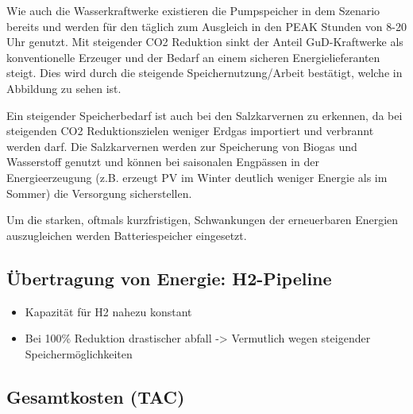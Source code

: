 Wie auch die Wasserkraftwerke existieren die Pumpspeicher in dem Szenario bereits und werden für den täglich zum Ausgleich in den PEAK Stunden von 8-20 Uhr genutzt.  Mit steigender CO2 Reduktion sinkt der Anteil GuD-Kraftwerke als konventionelle Erzeuger und der Bedarf an einem sicheren Energielieferanten steigt. Dies wird durch die steigende Speichernutzung/Arbeit bestätigt, welche in Abbildung  zu sehen ist.

Ein steigender Speicherbedarf ist auch bei den Salzkarvernen zu erkennen, da bei steigenden CO2 Reduktionszielen weniger Erdgas importiert und verbrannt werden darf. Die Salzkarvernen werden zur Speicherung von Biogas und Wasserstoff genutzt und können bei saisonalen Engpässen in der Energieerzeugung (z.B. erzeugt PV im Winter deutlich weniger Energie als im Sommer) die Versorgung sicherstellen.

Um die starken, oftmals kurzfristigen, Schwankungen der erneuerbaren Energien auszugleichen werden Batteriespeicher eingesetzt. 


\subsection{Übertragung von Energie: H2-Pipeline}
\begin{itemize}
  \item Kapazität für H2 nahezu konstant
  \item Bei 100\% Reduktion drastischer abfall -> Vermutlich wegen steigender Speichermöglichkeiten  
\end{itemize}

\subsection{Gesamtkosten (TAC)}





